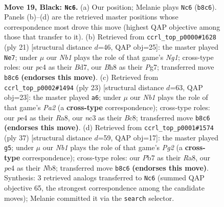 \documentclass[11pt]{article}
\begin{document}
\clearpage

\begin{figure}[p]\centering
\begin{subfigure}{0.46\textwidth}\centering
\resizebox{\linewidth}{!}{%
\newchessgame
\chessboard[
  setfen={rn3r1b/1ppb1k2/p4pp1/4p2p/2P1P3/2N2N2/PPB2PP1/R1B1K1R1 b - - 1 19},
  showmover=false,
  pgfstyle=straightmove, color=movearrow, markmove={b8-c6}
]}
\caption{}
\end{subfigure}\hfill
\begin{subfigure}{0.46\textwidth}\centering
\resizebox{\linewidth}{!}{%
\newchessgame
\chessboard[
  setfen={2kr2nr/1ppb2pp/p1pb1p2/8/3NP2P/2N1BP2/PPP3P1/R3K2R b KQ - 2 11},
  showmover=false,
  pgfstyle=straightmove, color=movearrow, markmove={g8-e7}
]}
\caption{}
\end{subfigure}
\\[4pt]
\begin{subfigure}{0.46\textwidth}\centering
\resizebox{\linewidth}{!}{%
\newchessgame
\chessboard[
  setfen={r1b1kb1r/ppp2ppp/2p3n1/P3P3/8/2N2N2/1PP2PPP/R1BR2K1 b - - 0 12},
  showmover=false,
  pgfstyle=straightmove, color=movearrow, markmove={a7-a6}
]}
\caption{}
\end{subfigure}\hfill
\begin{subfigure}{0.46\textwidth}\centering
\resizebox{\linewidth}{!}{%
\newchessgame
\chessboard[
  setfen={rnb4r/4kpp1/p3p2p/1p6/4PP2/1NN1bBP1/PPR4P/3K3R b - - 3 19},
  showmover=false,
  pgfstyle=straightmove, color=movearrow, markmove={g7-g5}
]}
\caption{}
\end{subfigure}
\caption{\textbf{Move 19, Black: \texttt{Nc6}.} (a) Our position; Melanie plays \texttt{Nc6} (\texttt{b8c6}). Panels (b)--(d) are the retrieved master positions whose correspondence most drove this move (highest QAP objective among those that transfer to it). (b) Retrieved from \texttt{ccrl\_top\_p0000\#1628} (ply 21) [structural distance $d$=46, QAP obj=25]: the master played \texttt{Ne7}; under $\mu$ our \emph{Nb1} plays the role of that game's \emph{Ng1}; cross-type roles: our \emph{p}c4 as their \emph{B}d7, our \emph{B}h8 as their \emph{P}g7; transferred move \texttt{b8c6} \textbf{(endorses this move)}. (c) Retrieved from \texttt{ccrl\_top\_p0002\#1494} (ply 23) [structural distance $d$=63, QAP obj=23]: the master played \texttt{a6}; under $\mu$ our \emph{Nb1} plays the role of that game's \emph{Pa2} (a \textbf{cross-type} correspondence); cross-type roles: our \emph{p}e4 as their \emph{R}a8, our \emph{n}c3 as their \emph{B}c8; transferred move \texttt{b8c6} \textbf{(endorses this move)}. (d) Retrieved from \texttt{ccrl\_top\_p0001\#1574} (ply 37) [structural distance $d$=59, QAP obj=17]: the master played \texttt{g5}; under $\mu$ our \emph{Nb1} plays the role of that game's \emph{Pg2} (a \textbf{cross-type} correspondence); cross-type roles: our \emph{P}b7 as their \emph{R}a8, our \emph{p}e4 as their \emph{N}b8; transferred move \texttt{b8c6} \textbf{(endorses this move)}. Synthesis: 3 retrieved analogs transferred to \texttt{Nc6} (summed QAP objective 65, the strongest correspondence among the candidate moves); Melanie committed it via the \texttt{search} selector.}
\label{fig:thought-m37}
\end{figure}
\end{document}
